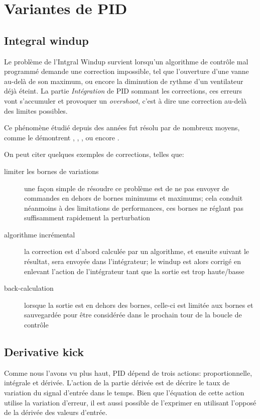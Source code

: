 \section{Variantes de PID}
\label{sec:alternatives-to-PID}

\subsection{Integral windup}
Le problème de l'Intgral Windup survient lorsqu'un algorithme de contrôle mal programmé demande une correction impossible, tel que l'ouverture d'une vanne au-delà de son maximum, ou encore la diminution de rythme d'un ventilateur déjà éteint.
La partie \emph{Intégration} de PID sommant les corrections, ces erreurs vont s'accumuler et provoquer un \emph{overshoot}, c'est à dire une correction au-delà des limites possibles.

Ce phénomène étudié depuis des années fut résolu par de nombreux moyens, comme le démontrent \cite{ControlGuruIntegralWindup}, \cite{astrom1995pid}, \cite{shin2012anti}, ou encore \cite{bohn1995analysis}.

On peut citer quelques exemples de corrections, telles que:
\begin{description}
    \item[limiter les bornes de variations] une façon simple de résoudre ce problème est de ne pas envoyer de commandes en dehors de bornes minimums et maximums;
    cela conduit néanmoins à des limitations de performances, ces bornes ne réglant pas suffisamment rapidement la perturbation

    \item[algorithme incrémental] la correction est d'abord calculée par un algorithme, et ensuite suivant le résultat, sera envoyée dans l'intégrateur;
    le windup est alors corrigé en enlevant l'action de l'intégrateur tant que la sortie est trop haute/basse

    \item[back-calculation] lorsque la sortie est en dehors des bornes, celle-ci est limitée aux bornes et sauvegardée pour être considérée dans le prochain tour de la boucle de contrôle
\end{description}

\subsection{Derivative kick}
Comme nous l'avons vu plus haut, PID dépend de trois actions: proportionnelle, intégrale et dérivée.
L'action de la partie dérivée est de décrire le taux de variation du signal d'entrée dans le temps.
Bien que l'équation de cette action utilise la variation d'erreur, il est aussi possible de l'exprimer en utilisant l'opposé de la dérivée des valeurs d'entrée.

